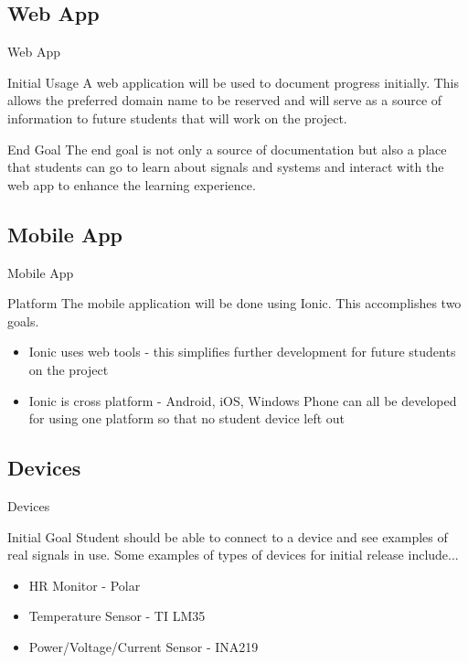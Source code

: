 \documentclass{beamer}
\begin{document}
\subsection{Web App}

\begin{frame}{Web App}

\begin{block}{Initial Usage}
A web application will be used to document progress initially. This allows the preferred domain name to be reserved and will serve as a source of information to future students that will work on the project.
\end{block}

\begin{block}{End Goal}
The end goal is not only a source of documentation but also a place that students can go to learn about signals and systems and interact with the web app to enhance the learning experience.
\end{block}

\end{frame}

\subsection{Mobile App}

\begin{frame}{Mobile App}

\begin{block}{Platform}
The mobile application will be done using Ionic. This accomplishes two goals.
\end{block}

\begin{itemize}
\item Ionic uses web tools - this simplifies further development for future students on the project
\item Ionic is cross platform - Android, iOS, Windows Phone can all be developed for using one platform so that no student device left out
\end{itemize}

\end{frame}

\subsection{Devices}

\begin{frame}{Devices}

\begin{block}{Initial Goal}
Student should be able to connect to a device and see examples of real signals in use. Some examples of types of devices for initial release include...
\end{block}

\begin{itemize}
\item HR Monitor - Polar
\item Temperature Sensor - TI LM35
\item Power/Voltage/Current Sensor -  INA219
\end{itemize}

\end{frame}
\end{document}
